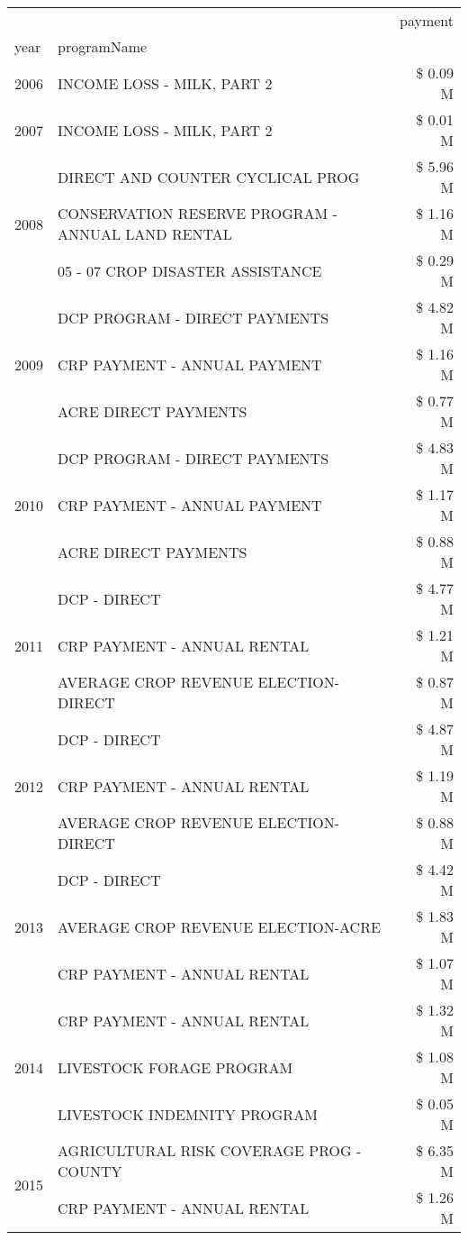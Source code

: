 \begin{tabular}{llr}
\toprule
 &  & payment \\
year & programName &  \\
\midrule
2006 & INCOME LOSS - MILK, PART 2 & \$ 0.09 M \\
\cline{1-3}
2007 & INCOME LOSS - MILK, PART 2 & \$ 0.01 M \\
\cline{1-3}
\multirow[t]{3}{*}{2008} & DIRECT AND COUNTER CYCLICAL PROG & \$ 5.96 M \\
 & CONSERVATION RESERVE PROGRAM - ANNUAL LAND RENTAL & \$ 1.16 M \\
 & 05 - 07 CROP DISASTER ASSISTANCE & \$ 0.29 M \\
\cline{1-3}
\multirow[t]{3}{*}{2009} & DCP PROGRAM - DIRECT PAYMENTS & \$ 4.82 M \\
 & CRP PAYMENT - ANNUAL PAYMENT & \$ 1.16 M \\
 & ACRE DIRECT PAYMENTS & \$ 0.77 M \\
\cline{1-3}
\multirow[t]{3}{*}{2010} & DCP PROGRAM - DIRECT PAYMENTS & \$ 4.83 M \\
 & CRP PAYMENT - ANNUAL PAYMENT & \$ 1.17 M \\
 & ACRE DIRECT PAYMENTS & \$ 0.88 M \\
\cline{1-3}
\multirow[t]{3}{*}{2011} & DCP - DIRECT & \$ 4.77 M \\
 & CRP PAYMENT - ANNUAL RENTAL & \$ 1.21 M \\
 & AVERAGE CROP REVENUE ELECTION-DIRECT & \$ 0.87 M \\
\cline{1-3}
\multirow[t]{3}{*}{2012} & DCP - DIRECT & \$ 4.87 M \\
 & CRP PAYMENT - ANNUAL RENTAL & \$ 1.19 M \\
 & AVERAGE CROP REVENUE ELECTION-DIRECT & \$ 0.88 M \\
\cline{1-3}
\multirow[t]{3}{*}{2013} & DCP - DIRECT & \$ 4.42 M \\
 & AVERAGE CROP REVENUE ELECTION-ACRE & \$ 1.83 M \\
 & CRP PAYMENT - ANNUAL RENTAL & \$ 1.07 M \\
\cline{1-3}
\multirow[t]{3}{*}{2014} & CRP PAYMENT - ANNUAL RENTAL & \$ 1.32 M \\
 & LIVESTOCK FORAGE PROGRAM & \$ 1.08 M \\
 & LIVESTOCK INDEMNITY PROGRAM & \$ 0.05 M \\
\cline{1-3}
\multirow[t]{3}{*}{2015} & AGRICULTURAL RISK COVERAGE PROG - COUNTY & \$ 6.35 M \\
 & CRP PAYMENT - ANNUAL RENTAL & \$ 1.26 M \\

\end{tabular}
